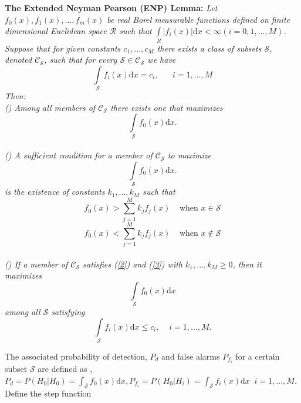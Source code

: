 \documentclass[12pt,journal,a4paper,twoside,onecolumn]{IEEEtran}
\newcommand{\rmnum}[1]{\romannumeral #1}
\begin{document}
\begin{spacing}{2.5}
\noindent  \textbf{The Extended Neyman Pearson (ENP) Lemma:}
\textit{
Let $f_0(x), f_1(x), ..., f_{m}(x)$ be real Borel measurable functions  defined on finite dimensional  Euclidean space $\mathcal{R}$ such that $\int \limits_R | f_i(x)|\mathrm{d}x < \infty (i=0, 1,...,M)$.  Suppose that for given constants $c_1,...,c_M$ there exists a class of subsets $\mathcal{S}$, denoted $\mathcal{C}_\mathcal{S}$, such that for every $\mathcal{S} \in \mathcal{C}_\mathcal{S}$ we have
\begin{equation}
\label{one}
\int\limits_\mathcal{S} f_i(x)\mathrm{d}x = c_i, \;\;\;\;\;\;i=1,...,M
\end{equation}
Then:
\\\textnormal{(\rmnum{1})} Among all members of $\mathcal{C}_\mathcal{S}$ there exists one that maximizes
\[
\int \limits_\mathcal{S} f_{0}(x)\mathrm{d}x.
\]
\\\textnormal{(\rmnum{2})} A sufficient condition for a member of $\mathcal{C}_\mathcal{S}$ to maximize
\[
\int \limits_\mathcal{S} f_{0}(x)\mathrm{d}x.
\]
is the existence of constants $k_1,...,k_M$ such that
\begin{equation}
\label{2}
f_{0}(x)>\sum\limits_{j=1}^M k_j f_j(x)\;\;\;\;\text{when $x \in \mathcal{S}$}
\end{equation}
\begin{equation}
\label{3}
f_{0}(x)<\sum\limits_{j=1}^M k_j f_j(x)\;\;\;\;\text{when $x \notin \mathcal{S}$}
\end{equation}
\\\textnormal{(\rmnum{3})} If a member of $\mathcal{C}_\mathcal{S}$ satisfies  \textnormal{(\ref{2})} and \textnormal{(\ref{3})} with $k_1,...,k_M\geq0$, then it maximizes
\begin{equation}
\label{4}
\int \limits_\mathcal{S} f_{0}(x)\mathrm{d}x
\end{equation}
among all $\mathcal{S}$ satisfying
\begin{equation}
\label{5}
\int \limits_\mathcal{S} f_i(x)\mathrm{d}x\leq c_i,\;\;\;\;i=1,...,M.
\end{equation}
}

The associated probability of detection, $P_d$ and false alarms $P_{f_i}$ for a certain subset $\mathcal{S}$ are defined as \cite{neyman1933problem}, $P_d = P(H_0 | H_0) = \int_{\mathcal{S}}f_0(x)\mathrm{d}x, P_{f_i} = P(H_0 | H_i) = \int_{\mathcal{S}}f_i(x)\mathrm{d}x\;\; i = 1, ..., M $. Define the step function


\end{spacing}
\end{document}
